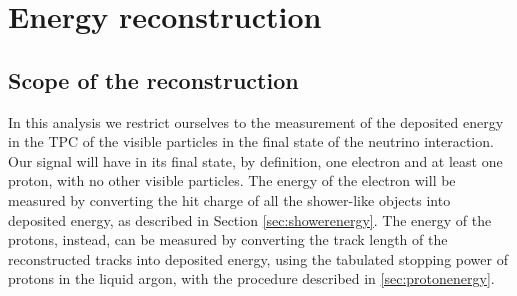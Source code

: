 
\section{Energy reconstruction}\label{sec:energyreco}
\subsection{Scope of the reconstruction}
In this analysis we restrict ourselves to the measurement of the deposited energy in the TPC of the visible particles in the final state of the neutrino interaction. Our signal will have in its final state, by definition, one electron and at least one proton, with no other visible particles. The energy of the electron will be measured by converting the hit charge of all the shower-like objects into deposited energy, as described in Section \ref{sec:showerenergy}. The energy of the protons, instead, can be measured by converting the track length of the reconstructed tracks into deposited energy, using the tabulated stopping power of protons in the liquid argon, with the procedure described in \ref{sec:protonenergy}.


